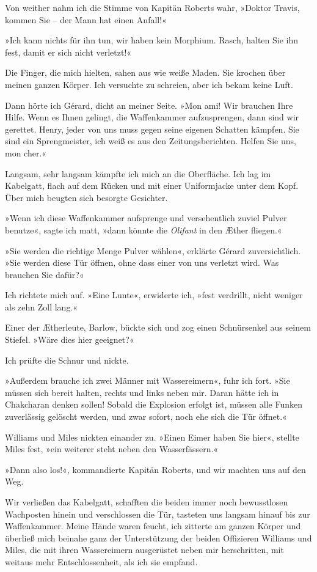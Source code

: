Von weither nahm ich die Stimme von Kapitän Roberts wahr, »Doktor
Travis, kommen Sie – der Mann hat einen Anfall!«

»Ich kann nichts für ihn tun, wir haben kein Morphium. Rasch,
halten Sie ihn fest, damit er sich nicht verletzt!«

Die Finger, die mich hielten, sahen aus wie weiße Maden. Sie
krochen über meinen ganzen Körper. Ich versuchte zu schreien, aber
ich bekam keine Luft.

Dann hörte ich Gérard, dicht an meiner Seite. »Mon ami! Wir
brauchen Ihre Hilfe. Wenn es Ihnen gelingt, die Waffenkammer
aufzusprengen, dann sind wir gerettet. Henry, jeder von uns muss
gegen seine eigenen Schatten kämpfen. Sie sind ein Sprengmeister,
ich weiß es aus den Zeitungsberichten. Helfen Sie uns, mon cher.«

Langsam, sehr langsam kämpfte ich mich an die Oberfläche. Ich lag
im Kabelgatt, flach auf dem Rücken und mit einer Uniformjacke unter
dem Kopf. Über mich beugten sich besorgte Gesichter.

»Wenn ich diese Waffenkammer aufsprenge und versehentlich zuviel
Pulver benutze«, sagte ich matt, »dann könnte die \emph{Olifant} in
den Æther fliegen.«

»Sie werden die richtige Menge Pulver wählen«, erklärte Gérard
zuversichtlich. »Sie werden diese Tür öffnen, ohne dass einer von
uns verletzt wird. Was brauchen Sie dafür?«

Ich richtete mich auf. »Eine Lunte«, erwiderte ich, »fest
verdrillt, nicht weniger als zehn Zoll lang.«

Einer der Ætherleute, Barlow, bückte sich und zog einen
Schnürsenkel aus seinem Stiefel. »Wäre dies hier geeignet?«

Ich prüfte die Schnur und nickte.

»Außerdem brauche ich zwei Männer mit Wassereimern«, fuhr ich fort.
»Sie müssen sich bereit halten, rechts und links neben mir. Daran
hätte ich in Chakcharan denken sollen! Sobald die Explosion erfolgt
ist, müssen alle Funken zuverlässig gelöscht werden, und zwar
sofort, noch ehe sich die Tür öffnet.«

Williams und Miles nickten einander zu. »Einen Eimer haben Sie
hier«, stellte Miles fest, »ein weiterer steht neben den
Wasserfässern.«

»Dann also los!«, kommandierte Kapitän Roberts, und wir machten uns
auf den Weg.

\bigpar

Wir verließen das Kabelgatt, schafften die beiden immer noch
bewusstlosen Wachposten hinein und verschlossen die Tür, tasteten
uns langsam hinauf bis zur Waffenkammer. Meine Hände waren feucht,
ich zitterte am ganzen Körper und überließ mich beinahe ganz der
Unterstützung der beiden Offizieren Williams und Miles, die mit
ihren Wassereimern ausgerüstet neben mir herschritten, mit weitaus
mehr Entschlossenheit, als ich sie empfand.


